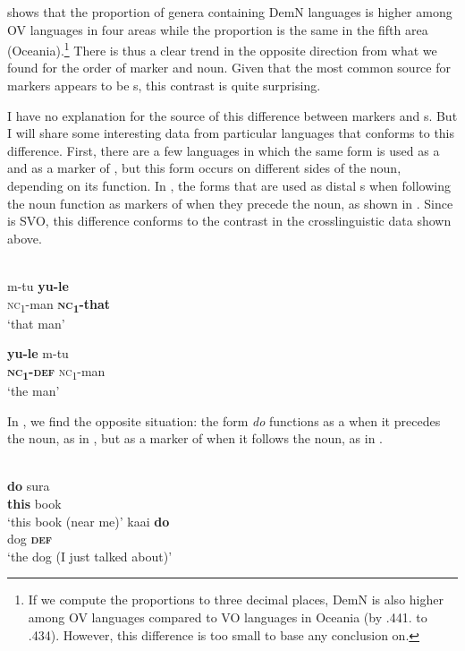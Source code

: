 \documentclass[output=paper]{langsci/langscibook}
\begin{document}
\newpage
\noindent {} shows that the proportion of genera containing DemN languages is higher among OV languages in four areas while the proportion is the same in the fifth area (Oceania).\footnote{If we compute the proportions to three decimal places, DemN is also higher among OV languages compared to VO languages in Oceania (by .441. to .434). However, this difference is too small to base any conclusion on.} There is thus a clear trend in the opposite direction from what we found for the order of  marker and noun. Given that the most common  source for  markers appears to be s, this contrast is quite surprising.

I have no explanation for the source of this difference between  markers and s. But I will share some interesting data from particular languages that conforms to this difference. First, there are a few languages in which the same form is used as a  and as a marker of , but this form occurs on different sides of the noun, depending on its function. In , the forms that are used as distal s when following the noun function as markers of  when they precede the noun, as shown in . Since  is SVO, this difference conforms to the contrast in the crosslinguistic data shown above.

\ea\label{ex:dryer:37}
\\
  \ea \gll  m-tu  \textbf{yu-le}\\
	  \textsc{nc}\textsubscript{1}{}-man  \textbf{\textsc{nc}}\textbf{\textsubscript{1}}\textbf{{}-that}\\
  \glt     ‘that man’

  \ex
  \gll    \textbf{yu-le}  m-tu\\
	  \textbf{\textsc{nc}}\textbf{\textsubscript{1}}\textbf{{}-}\textbf{\textsc{def}}  \textsc{nc}\textsubscript{1}{}-man\\
  \glt     ‘the man’
  \z
\z

In , we find the opposite situation: the form \textit{do} functions as a  when it precedes the noun, as in , but as a marker of  when it follows the noun, as in .

\ea\label{ex:dryer:38}
\\
\ea\label{ex:dryer:38a}
\gll     \textbf{do}  sura  \\  
         \textbf{this}  book\\    
\glt     ‘this book (near me)’  
\ex \label{ex:dryer:38b}
\gll kaai  \textbf{do}\\
    dog  \textbf{\textsc{def}}\\
\glt  ‘the dog (I just talked about)’
\z
\z
\end{document}
